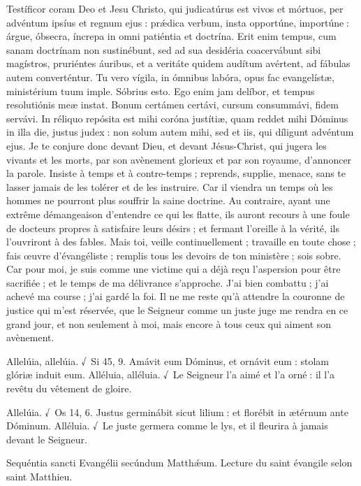 \begin{paracol}{2}
Testíficor coram Deo et Jesu  Christo, qui judicatúrus est vivos et mórtuos, per advéntum ipsíus et regnum ejus : prǽdica verbum, insta opportúne, importúne : árgue, óbsecra, íncrepa in omni patiéntia et doctrína. Erit enim tempus, cum sanam doctrínam non sustinébunt, sed ad sua desidéria coacervábunt sibi magístros, pruriéntes áuribus, et a veritáte quidem audítum avértent, ad fábulas autem converténtur. Tu vero vígila, in ómnibus labóra, opus fac evangelístæ, ministérium tuum imple. Sóbrius esto. Ego enim jam delíbor, et tempus resolutiónis meæ instat. Bonum certámen certávi, cursum consummávi, fidem servávi. In réliquo repósita est mihi coróna justítiæ, quam reddet mihi Dóminus in illa die, justus judex : non solum autem mihi, sed et iis, qui díligunt advéntum ejus.
\switchcolumn
Je te conjure donc devant Dieu, et devant  Jésus-Christ, qui jugera les vivants et les morts, par son avènement glorieux et par son royaume, d’annoncer la parole. Insiste à temps et à contre-temps ; reprends, supplie, menace, sans te lasser jamais de les tolérer et de les instruire. Car il viendra un temps où les hommes ne pourront plus souffrir la saine doctrine. Au contraire, ayant une extrême démangeaison d’entendre ce qui les flatte, ils auront recours à une foule de docteurs propres à satisfaire leurs désirs ; et fermant l’oreille à la vérité, ils l’ouvriront à des fables. Mais toi, veille continuellement ; travaille en toute chose ; fais œuvre d’évangéliste ; remplis tous les devoirs de ton ministère ; sois sobre. Car pour moi, je suis comme une victime qui a déjà reçu l’aspersion pour être sacrifiée ; et le temps de ma délivrance s’approche. J’ai bien combattu ; j’ai achevé ma course ; j’ai gardé la foi. Il ne me reste qu’à attendre la couronne de justice qui m’est réservée, que le Seigneur comme un juste juge me rendra en ce grand jour, et non seulement à moi, mais encore à tous ceux qui aiment son avènement.
\switchcolumn*

Allelúia, allelúia. √~Si 45, 9. Amávit eum Dóminus, et ornávit eum : stolam glóriæ induit eum.
\switchcolumn
Alléluia, alléluia. √~Le Seigneur l’a aimé et l’a orné : il l’a revêtu du vêtement de gloire.
\switchcolumn*

Allelúia. √~Os 14, 6. Justus germinábit sicut lilium : et florébit in ætérnum ante Dóminum.
\switchcolumn
Alléluia. √~Le juste germera comme le lys, et il fleurira à jamais devant le Seigneur.
\switchcolumn*

Sequéntia sancti Evangélii secúndum Matthǽum.
\switchcolumn
Lecture du saint évangile selon saint Matthieu.
\switchcolumn*


\end{paracol}
